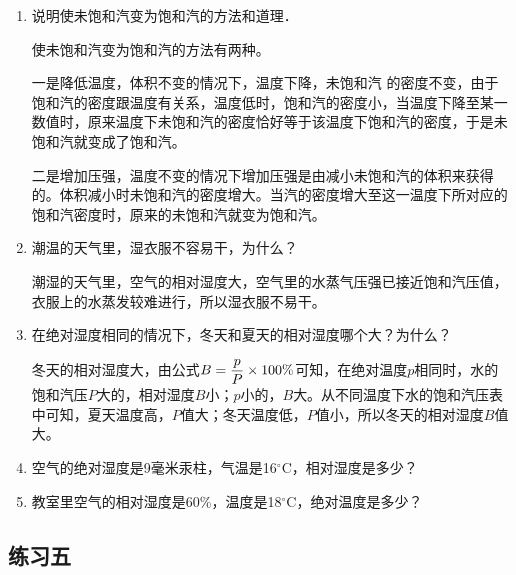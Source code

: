 \begin{enumerate}
	\item 说明使未饱和汽变为饱和汽的方法和道理．
    
  \begin{solution}
使未饱和汽变为饱和汽的方法有两种。

一是降低温度，体积不变的情况下，温度下降，未饱和汽
的密度不变，由于饱和汽的密度跟温度有关系，温度低时，饱和汽的密度小，当温度下降至某一数值时，原来温度下未饱和汽的密度恰好等于该温度下饱和汽的密度，于是未饱和汽就变成了饱和汽。

二是增加压强，温度不变的情况下增加压强是由减小未饱和汽的体积来获得的。体积减小时未饱和汽的密度增大。当汽的密度增大至这一温度下所对应的饱和汽密度时，原来的未饱和汽就变为饱和汽。
  \end{solution}
\item 潮温的天气里，湿衣服不容易干，为什么？
    
\begin{solution}
  潮湿的天气里，空气的相对湿度大，空气里的水蒸气压强已接近饱和汽压值，衣服上的水蒸发较难进行，所以湿衣服不易干。
\end{solution}
\item 在绝对湿度相同的情况下，冬天和夏天的相对湿度哪个大？为什么？
    
\begin{solution}
冬天的相对湿度大，由公式$B=\dfrac{p}{P}\times 100\%$可知，在绝对温度$p$相同时，水的饱和汽压$P$大的，相对湿度$B$小；$p$小的，$B$大。从不同温度下水的饱和汽压表中可知，夏天温度高，$P$值大；冬天温度低，$P$值小，所以冬天的相对湿度$B$值大。
\end{solution}
\item 空气的绝对湿度是9毫米汞柱，气温是16$^\circ$C，相对湿度是多少？
    
\begin{solution}
  
\end{solution}
\item 教室里空气的相对湿度是60\%，温度是18$^\circ$C，绝对温度是多少？
    
\begin{solution}
  
\end{solution}
\end{enumerate}





\subsection{练习五}

